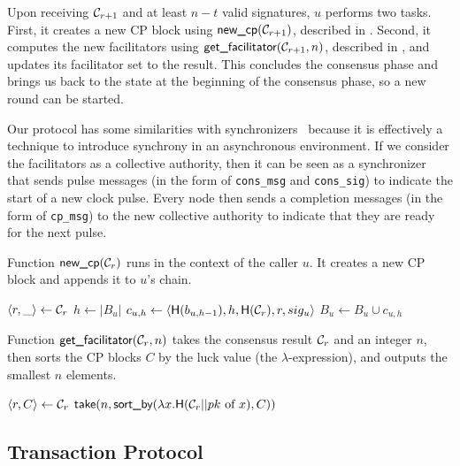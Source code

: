 Upon receiving $\mathcal{C}_{r + 1}$ and at least $n - t$ valid signatures, $u$ performs two tasks.
First, it creates a new CP block using $\textsf{new\_cp}(\mathcal{C}_{r + 1})$, described in .
Second, it computes the new facilitators using $\textsf{get\_facilitator}(\mathcal{C}_{r + 1}, n)$, described in ,
and updates its facilitator set to the result.
This concludes the consensus phase and brings us back to the state at the beginning of the consensus phase,
so a new round can be started.

Our protocol has some similarities with synchronizers~\cite[Chapter 10]{podc} because it is effectively a technique to introduce synchrony in an asynchronous environment.
If we consider the facilitators as a collective authority, then it can be seen as a synchronizer that sends pulse messages (in the form of \texttt{cons\_msg} and \texttt{cons\_sig}) to indicate the start of a new clock pulse.
Every node then sends a completion messages (in the form of \texttt{cp\_msg}) to the new collective authority to indicate that they are ready for the next pulse.

\begin{algorithm}
\caption{Function $\textsf{new\_cp}(\mathcal{C}_r)$ runs in the context of the caller $u$.
It creates a new CP block and appends it to $u$'s chain.}
\label{alg:new-cp}
\begin{algorithmic}
\State $\langle r, \_ \rangle \gets \mathcal{C}_r$
\State $h \gets |B_u|$
\State $c_{u, h} \gets \langle \textsf{H}(b_{u, h-1}), h, \textsf{H}(\mathcal{C}_r), r, sig_u \rangle$
\State $B_u \gets B_u \cup c_{u, h}$
\end{algorithmic}
\end{algorithm}

\begin{algorithm}
\caption{Function $\textsf{get\_facilitator}(\mathcal{C}_r, n)$ takes the consensus result $\mathcal{C}_r$ and an integer $n$,
then sorts the CP blocks $C$ by the luck value (the $\lambda$-expression), and outputs the smallest $n$ elements.}
\label{alg:facilitator}
\begin{algorithmic}
\State $\langle r, C \rangle \gets \mathcal{C}_r$
\State \Return $\textsf{take} (n, \textsf{sort\_by} (\lambda x.\textsf{H}(\mathcal{C}_r || pk \text{ of } x), C))$
\end{algorithmic}
\end{algorithm}

\subsection{Transaction Protocol}
\label{sec:tx-protocol}

